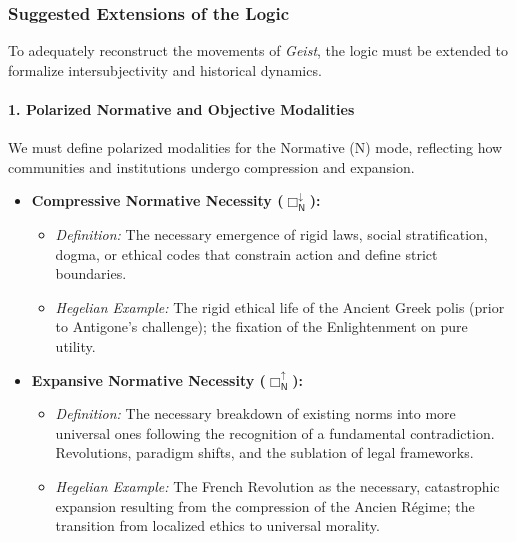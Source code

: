 \subsubsection{Suggested Extensions of the Logic}\label{suggested-extensions-of-the-logic}

To adequately reconstruct the movements of \emph{Geist}, the logic must be extended to formalize intersubjectivity and historical dynamics.

\paragraph{1. Polarized Normative and Objective Modalities}\label{polarized-normative-and-objective-modalities}

We must define polarized modalities for the Normative (N) mode, reflecting how communities and institutions undergo compression and expansion.

\begin{itemize}
\tightlist
\item
  \textbf{Compressive Normative Necessity (\(\Box_{\mathsf{N}}^{\downarrow}\)):}

  \begin{itemize}
  \tightlist
  \item
    \emph{Definition:} The necessary emergence of rigid laws, social stratification, dogma, or ethical codes that constrain action and define strict boundaries.
  \item
    \emph{Hegelian Example:} The rigid ethical life of the Ancient Greek polis (prior to Antigone's challenge); the fixation of the Enlightenment on pure utility.
  \end{itemize}
\item
  \textbf{Expansive Normative Necessity (\(\Box_{\mathsf{N}}^{\uparrow}\)):}

  \begin{itemize}
  \tightlist
  \item
    \emph{Definition:} The necessary breakdown of existing norms into more universal ones following the recognition of a fundamental contradiction. Revolutions, paradigm shifts, and the sublation of legal frameworks.
  \item
    \emph{Hegelian Example:} The French Revolution as the necessary, catastrophic expansion resulting from the compression of the Ancien Régime; the transition from localized ethics to universal morality.
  \end{itemize}
\end{itemize}

